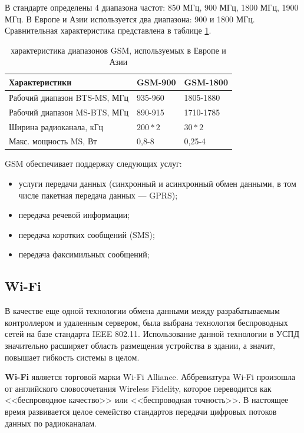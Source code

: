В стандарте определены 4 диапазона частот: 850 МГц, 900 МГц, 1800 МГц, 1900 МГц. В Европе и Азии используется два диапазона: 900 и 1800 МГц. Сравнительная характеристика представлена в таблице \ref{gsmtable}.

\begin{table}[h!]
\caption{характеристика диапазонов GSM, используемых в Европе и Азии\cite{gsmchar}}
\label{gsmtable}
	\begin{tabular}{|m{70mm}|m{40mm}|m{40mm}|}
	\hline
	Характеристики & GSM-900 & GSM-1800\\
	\hline
	Рабочий диапазон BTS-MS, МГц & 935-960 & 1805-1880\\
	\hline
	Рабочий диапазон MS-BTS, МГц & 890-915 & 1710-1785\\
	\hline
	Ширина радиоканала, кГц & $200*2$ & $30*2$\\
	\hline
	Макс. мощность MS, Вт & 0,8-8 & 0,25-4 \\
	\hline
	\end{tabular}
\end{table}

GSM обеспечивает поддержку следующих услуг:
\begin{itemize}
\item услуги передачи данных (синхронный и асинхронный обмен данными, в том числе пакетная передача данных — GPRS);
\item передача речевой информации;
\item передача коротких сообщений (SMS);
\item передача факсимильных сообщений;
\end{itemize}

\newpage

\subsection{Wi-Fi}

В качестве еще одной технологии обмена данными между разрабатываемым контроллером и удаленным сервером, была выбрана технология беспроводных сетей на базе стандарта IEEE 802.11. Использование данной технологии в УСПД значительно расширяет область размещения устройства в здании, а значит, повышает гибкость системы в целом.

\textbf{Wi-Fi} является торговой марки Wi-Fi Alliance. Аббревиатура Wi-Fi произошла от английского словосочетания Wireless Fidelity, которое переводится как <<беспроводное качество>> или <<беспроводная точность>>. В настоящее время развивается целое семейство стандартов передачи цифровых потоков данных по радиоканалам.

